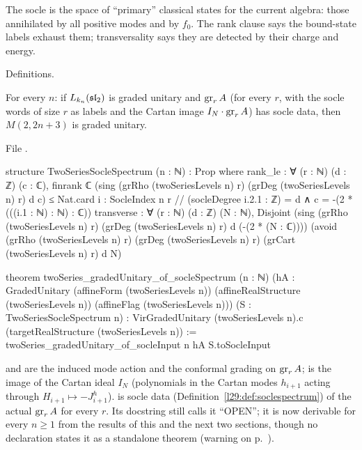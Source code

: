 \begin{physics}
The socle is the space of ``primary'' classical states for the current algebra: those annihilated by all positive
modes and by $f_0$. The rank clause says the bound-state labels exhaust them; transversality says they are detected by
their charge and energy.
\end{physics}

\begin{status}
Definitions.
\end{status}

\begin{theorem}\label{l29:thm:soclespectrum}
For every $n$: if $L_{k_n}(\mathfrak{sl}_2)$ is graded unitary and $\operatorname{gr}_rA$ (for every $r$, with the socle
words of size $r$ as labels and the Cartan image $I_N\cdot\operatorname{gr}_rA$) has socle data, then $M(2,2n+3)$ is
graded unitary.
\end{theorem}

\noindent File .
\begin{leancode}
structure TwoSeriesSocleSpectrum (n : ℕ) : Prop where
  rank_le : ∀ (r : ℕ) (d : ℤ) (c : ℂ),
    finrank ℂ (sing (grRho (twoSeriesLevels n) r) (grDeg (twoSeriesLevels n) r) d c) ≤
      Nat.card {i : SocleIndex n r //
        (socleDegree i.2.1 : ℤ) = d ∧ c = -(2 * (((i.1 : ℕ) : ℕ) : ℂ))}
  transverse : ∀ (r : ℕ) (d : ℤ) (N : ℕ),
    Disjoint (sing (grRho (twoSeriesLevels n) r) (grDeg (twoSeriesLevels n) r) d
        (-(2 * (N : ℂ))))
      (avoid (grRho (twoSeriesLevels n) r) (grDeg (twoSeriesLevels n) r)
        (grCart (twoSeriesLevels n) r) d N)

theorem twoSeries_gradedUnitary_of_socleSpectrum (n : ℕ)
    (hA : GradedUnitary (affineForm (twoSeriesLevels n)) (affineRealStructure (twoSeriesLevels n))
      (affineFlag (twoSeriesLevels n)))
    (S : TwoSeriesSocleSpectrum n) :
    VirGradedUnitary (twoSeriesLevels n).c (targetRealStructure (twoSeriesLevels n)) :=
  twoSeries_gradedUnitary_of_socleInput n hA S.toSocleInput
\end{leancode}

\begin{dictionary}
 and  are the induced mode action and the conformal grading on $\operatorname{gr}_rA$;
 is the image of the Cartan ideal $I_N$ (polynomials in the Cartan modes $h_{i+1}$ acting through
$H_{i+1}\mapsto-J^h_{i+1}$).  is socle data (Definition~\ref{l29:def:soclespectrum})
of the actual $\operatorname{gr}_rA$ for every $r$. Its docstring still calls it ``OPEN''; it is now derivable for every
$n\ge1$ from the results of this and the next two sections, though no declaration states it as a standalone theorem
(warning on p.~\pageref{l29:warn:stale}).
\end{dictionary}

